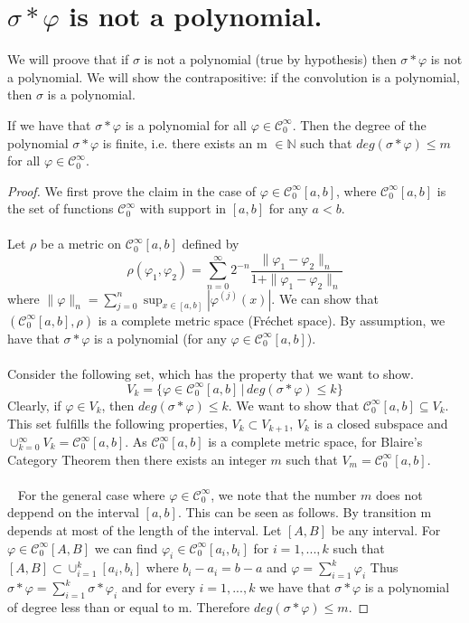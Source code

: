 \documentclass[../main.tex]{subfiles}
\begin{document}
	\section{$\sigma \ast \varphi$ is not a polynomial.}
	\noindent We will proove that if $\sigma$ is not a polynomial (true by hypothesis) then $\sigma \ast \varphi$ is not a polynomial. We will show the contrapositive: if the convolution is a polynomial, then $\sigma$ is a polynomial.
	\begin{lema}  %
		If we have that $\sigma \ast \varphi $ is a polynomial for all $\varphi \in \mathcal{C}^\infty_0 $.  Then the degree of the polynomial $\sigma \ast \varphi $ is finite, i.e. there exists an m $\in \mathbb{N}$ such that $ deg (\sigma \ast \varphi) \leq m$ for all $\varphi \in \mathcal{C}^\infty_0$. 
	\end{lema}
	\begin{proof}
		We first prove the claim in the case of $\varphi \in \mathcal{C}^\infty_0[a,b]$, where $\mathcal{C}^\infty_0[a,b]$ is the set of functions $\mathcal{C}^\infty_0$ with support in $[a,b]$ for any $a<b$. \\ \\ Let $\rho$ be a metric on $\mathcal{C}^\infty_0[a,b]$ defined by
		$$\rho(\varphi_1,\varphi_2) = \sum_{n=0}^\infty 2^{-n}  \frac{\|\varphi_1 -\varphi_2\|_n}{1+\|\varphi_1 -\varphi_2\|_n}$$ where $\|\varphi\|_n= \sum_{j=0}^n \sup_{x\in [a,b]} | \varphi^{(j)}(x)| $. We can show that $(\mathcal{C}^\infty_0[a,b],\rho)$  is a complete metric space (Fréchet space). By assumption, we have that $\sigma \ast \varphi$ is a polynomial (for any $\varphi \in \mathcal{C}^\infty_0[a,b]$). \\ \\  Consider the following set, which has the property that we want to show.  \\ $$V_k= \{\varphi \in \mathcal{C}_0^\infty[a,b] \, | \,  deg(\sigma \ast \varphi ) \leq k\}$$ Clearly, if $\varphi \in V_k$, then $deg(\sigma \ast \varphi) \leq k.$ We want to show that $\mathcal{C}_0^\infty[a,b] \subseteq V_k.$ This set fulfills the following properties, $V_k \subset V_{k+1}$, $V_k $ is a closed subspace and $\cup_{k=0}^\infty V_k = \mathcal{C}_0^\infty[a,b]$. As $\mathcal{C}_0^\infty[a,b]$ is a complete metric space, for Blaire's Category Theorem then there exists an integer $m$ such that $V_m=\mathcal{C}_0^\infty[a,b]$. \\ \\ 
		For the general case where $\varphi \in \mathcal{C}_0^\infty$, we note that the number $m$ does not deppend on the interval $[a,b]$. This can be seen as follows. By transition m depends at most of the length of the interval. Let $[A,B]$ be any interval. For $\varphi \in \mathcal{C}^\infty_0[A,B]$ we can find $\varphi_i \in \mathcal{C}^\infty_0[a_i,b_i]$ for $i=1,...,k$ such that $[A,B] \subset \cup_{i=1}^k[a_i,b_i]$ where $b_i -a_i =b-a$ and $\varphi=\sum_{i=1}^k \varphi_i$ Thus $\sigma \ast \varphi = \sum_{i=1}^k \sigma \ast \varphi_i$ and for every $i=1,...,k $ we have that $\sigma \ast \varphi$ is a polynomial of degree less than or equal to m. Therefore $deg(\sigma \ast \varphi) \leq m$.
	\end{proof}
\end{document}

